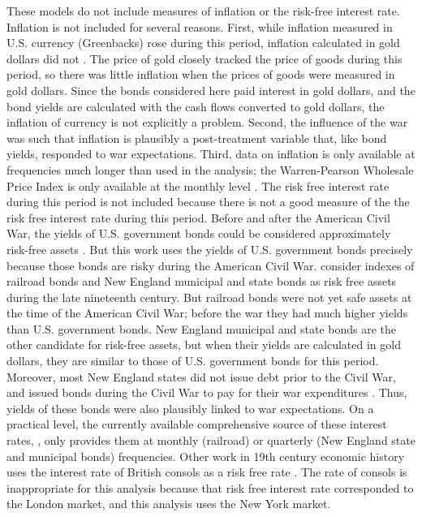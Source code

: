 These models do not include measures of inflation or the risk-free interest rate.
Inflation is not included for several reasons.
First, while inflation measured in U.S. currency (Greenbacks) rose during this period, inflation calculated in gold dollars did not \parencites{Mitchell1903}{Mitchell1908}.
The price of gold closely tracked the price of goods during this period, so there was little inflation when the prices of goods were measured in gold dollars.
Since the bonds considered here paid interest in gold dollars, and the bond yields are calculated with the cash flows converted to gold dollars, the inflation of currency is not explicitly a problem.
Second, the influence of the war was such that inflation is plausibly a post-treatment variable that, like bond yields, responded to war expectations.
Third, data on inflation is only available at frequencies much longer than used in the analysis; the Warren-Pearson Wholesale Price Index is only available at the monthly level \parencite{WarrenPearson1933a}.
The risk free interest rate during this period is not included because there is not a good measure of the the risk free interest rate during this period.
Before and after the American Civil War, the yields of U.S. government bonds could be considered approximately risk-free assets \parencites{HomerSylla2005}.
But this work uses the yields of U.S. government bonds precisely because those bonds are risky during the American Civil War.
\textcites{Macaulay1938}{HomerSylla2005} consider indexes of railroad bonds and New England municipal and state bonds as risk free assets during the late nineteenth century.
But railroad bonds were not yet safe assets at the time of the American Civil War; before the war they had much higher yields than U.S. government bonds.
New England municipal and state bonds are the other candidate for risk-free assets, but when their yields are calculated in gold dollars, they are similar to those of U.S. government bonds for this period.
Moreover, most New England states did not issue debt prior to the Civil War, and issued bonds during the Civil War to pay for their war expenditures \parencite[86--87]{Martin1871}.
Thus, yields of these bonds were also plausibly linked to war expectations.
On a practical level, the currently available comprehensive source of these interest rates, \textcite{Macaulay1938}, only provides them at monthly (railroad) or quarterly (New England state and municipal bonds) frequencies.
Other work in 19th century economic history uses the interest rate of British consols as a risk free rate \parencite{BordoRockoff1996a}.
The rate of consols is inappropriate for this analysis because that risk free interest rate corresponded to the  London market, and this analysis uses the New York market.



